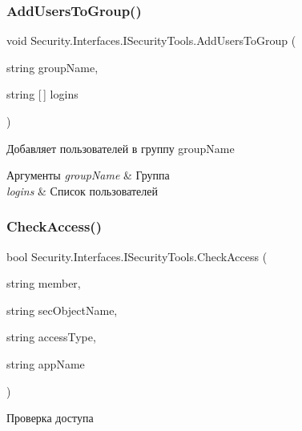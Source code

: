 \subsubsection{\texorpdfstring{Add\+Users\+To\+Group()}{AddUsersToGroup()}}
{\footnotesize\ttfamily void Security.\+Interfaces.\+I\+Security\+Tools.\+Add\+Users\+To\+Group (\begin{DoxyParamCaption}\item[{string}]{group\+Name,  }\item[{string \mbox{[}$\,$\mbox{]}}]{logins }\end{DoxyParamCaption})}



Добавляет пользователей в группу group\+Name 


\begin{DoxyParams}{Аргументы}
{\em group\+Name} & Группа\\
\hline
{\em logins} & Список пользователей\\
\hline
\end{DoxyParams}
\mbox{\label{interface_security_1_1_interfaces_1_1_i_security_tools_a744adcef9183e1a92ddbc475d05f23ce}} 
\subsubsection{\texorpdfstring{Check\+Access()}{CheckAccess()}}
{\footnotesize\ttfamily bool Security.\+Interfaces.\+I\+Security\+Tools.\+Check\+Access (\begin{DoxyParamCaption}\item[{string}]{member,  }\item[{string}]{sec\+Object\+Name,  }\item[{string}]{access\+Type,  }\item[{string}]{app\+Name }\end{DoxyParamCaption})}



Проверка доступа 


